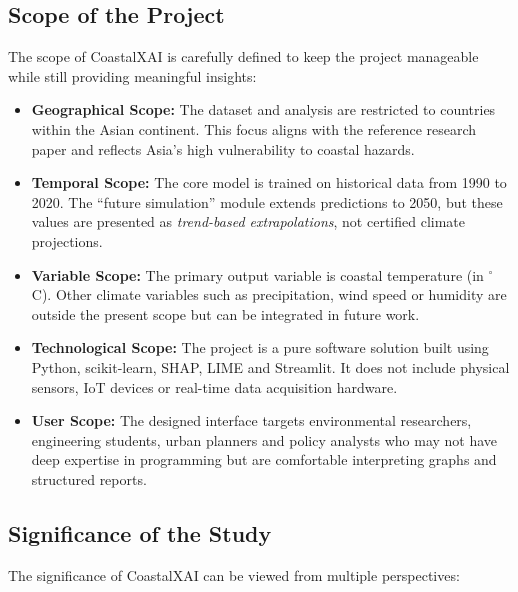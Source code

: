 \documentclass[12pt, a4paper]{article}
\begin{document}
\subsection{\textbf{Scope of the Project}}

The scope of CoastalXAI is carefully defined to keep the project
manageable while still providing meaningful insights:

\begin{itemize}
  \item \textbf{Geographical Scope:} The dataset and analysis are
  restricted to countries within the Asian continent. This focus
  aligns with the reference research paper \cite{wang2024} and
  reflects Asia's high vulnerability to coastal hazards.
  \item \textbf{Temporal Scope:} The core model is trained on historical
  data from 1990 to 2020. The ``future simulation'' module extends
  predictions to 2050, but these values are presented as
  \textit{trend-based extrapolations}, not certified climate
  projections.
  \item \textbf{Variable Scope:} The primary output variable is coastal
  temperature (in $^\circ$C). Other climate variables such as
  precipitation, wind speed or humidity are outside the present
  scope but can be integrated in future work.
  \item \textbf{Technological Scope:} The project is a pure software
  solution built using Python, scikit-learn, SHAP, LIME and
  Streamlit. It does not include physical sensors, IoT devices or
  real-time data acquisition hardware.
  \item \textbf{User Scope:} The designed interface targets environmental
  researchers, engineering students, urban planners and policy
  analysts who may not have deep expertise in programming but are
  comfortable interpreting graphs and structured reports.
\end{itemize}

\subsection{\textbf{Significance of the Study}}

The significance of CoastalXAI can be viewed from multiple
perspectives:
\end{document}
